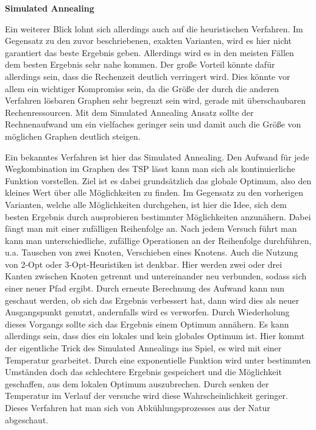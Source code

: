 \textbf{Simulated Annealing}

Ein weiterer Blick lohnt sich allerdings auch auf die heuristischen Verfahren. Im Gegensatz zu den zuvor beschriebenen, exakten Varianten, wird es hier nicht garantiert das beste Ergebnis geben. Allerdings wird es in den meisten Fällen dem besten Ergebnis sehr nahe kommen. Der große Vorteil könnte dafür allerdings sein, dass die Rechenzeit deutlich verringert wird. Dies könnte vor allem ein wichtiger Kompromiss sein, da die Größe der durch die anderen Verfahren lösbaren Graphen sehr begrenzt sein wird, gerade mit überschaubaren Rechenressourcen. Mit dem Simulated Annealing Ansatz sollte der Rechnenaufwand um ein vielfaches geringer sein und damit auch die Größe von möglichen Graphen deutlich steigen.

Ein bekanntes Verfahren ist hier das Simulated Annealing. Den Aufwand für jede Wegkombination im Graphen des TSP lässt kann man sich als kontinuierliche Funktion vorstellen. Ziel ist es dabei grundsätzlich das globale Optimum, also den kleines Wert über alle Möglichkeiten zu finden. Im Gegensatz zu den vorherigen Varianten, welche alle Möglichkeiten durchgehen, ist hier die Idee, sich dem besten Ergebnis durch ausprobieren bestimmter Möglichkeiten anzunähern. Dabei fängt man mit einer zufälligen Reihenfolge an. Nach jedem Versuch führt man kann man unterschiedliche, zufällige Operationen an der Reihenfolge durchführen, u.a. Tauschen von zwei Knoten, Verschieben eines Knotens. Auch die Nutzung von 2-Opt oder 3-Opt-Heuristiken ist denkbar. Hier werden zwei oder drei Kanten zwischen Knoten getrennt und untereinander neu verbunden, sodass sich einer neuer Pfad ergibt. Durch erneute Berechnung des Aufwand kann nun geschaut werden, ob sich das Ergebnis verbessert hat, dann wird dies als neuer Ausgangspunkt genutzt, andernfalls wird es verworfen. Durch Wiederholung dieses Vorgangs sollte sich das Ergebnis einem Optimum annähern. Es kann allerdings sein, dass dies ein lokales und kein globales Optimum ist. Hier kommt der eigentliche Trick des Simulated Annealings ins Spiel, es wird mit einer \glqq{}Temperatur\grqq{} gearbeitet. Durch eine exponentielle Funktion wird unter bestimmten Umständen doch das schlechtere Ergebnis gespeichert und die Möglichkeit geschaffen, aus dem lokalen Optimum auszubrechen. Durch senken der Temperatur im Verlauf der versuche wird diese Wahrscheinlichkeit geringer. Dieses Verfahren hat man sich von Abkühlungsprozesses aus der Natur abgeschaut. \cite{tspSimulatedAnnealing}

